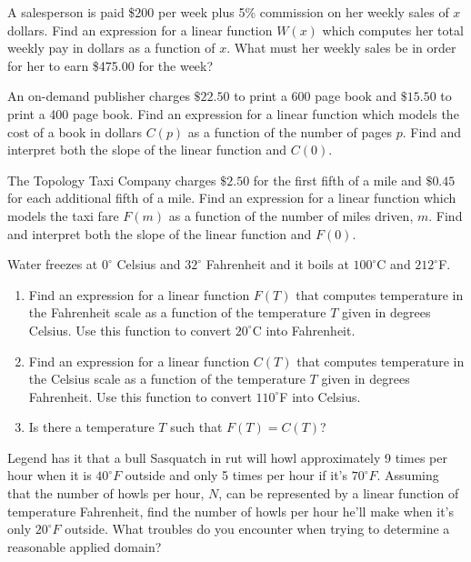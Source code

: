 \begin{exenum}
\item A salesperson is paid \$200 per week plus 5\% commission on her weekly sales of $x$ dollars.  Find an expression for a  linear function $W(x)$ which computes her total weekly pay in dollars as a function of $x$.  What must her weekly sales be in order for her to earn \$475.00 for the week?

\item  An on-demand publisher charges $\$22.50$ to print a 600 page book and $\$15.50$ to print a 400 page book.  Find an expression for a linear function which models the cost of a book in dollars $C(p)$ as a function of the number of pages $p$.  Find and interpret both the slope of the linear function  and $C(0)$.

\item The Topology Taxi Company charges $\$2.50$ for the first fifth of a mile and $\$0.45$ for each additional fifth of a mile.  Find an expression for a  linear function which models the taxi fare $F(m)$ as a function of the number of miles driven, $m$.  Find and interpret both the slope of the linear function  and $F(0)$.

\item Water freezes at $0^{\circ}$ Celsius and $32^{\circ}$ Fahrenheit and it boils at $100^{\circ}$C and $212^{\circ}$F.
\label{celsiustofahr}

\begin{enumerate}

\item Find an expression for a  linear function $F(T)$ that computes temperature in the Fahrenheit scale as a function of  the temperature $T$ given in degrees Celsius.  Use this function to convert $20^{\circ}$C into Fahrenheit.

\item Find an expression for a  linear function $C(T)$ that computes temperature in the Celsius scale as a function of  the temperature $T$ given in degrees Fahrenheit.  Use this function to convert $110^{\circ}$F into Celsius.

\item Is there a temperature $T$ such that $F(T) = C(T)$?

\end{enumerate}

\item Legend has it that a bull Sasquatch in rut will howl approximately 9 times per hour when it is $40^{\circ}F$ outside and only 5 times per hour if it's $70^{\circ}F$.  Assuming that the number of howls per hour, $N$, can be represented by a linear function of temperature Fahrenheit, find the number of howls per hour he'll make when it's only $20^{\circ}F$ outside. What troubles do you encounter when trying to determine a reasonable applied domain?


\end{exenum}
